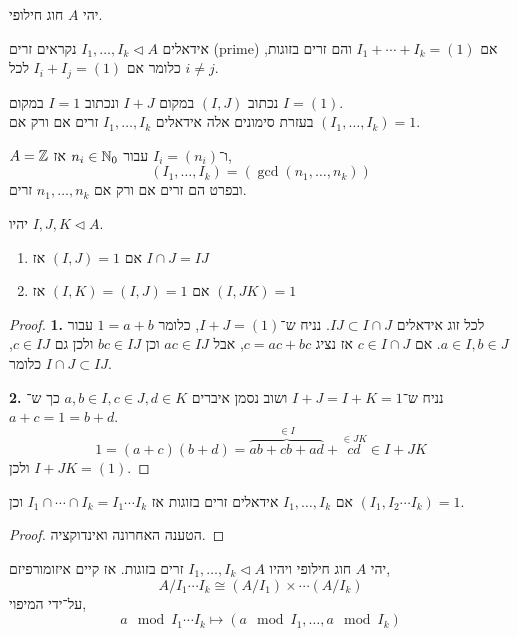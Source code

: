 יהי $A$ חוג חילופי.
\begin{definition}
	אידאלים $I_1, \ldots, I_k \triangleleft A$ נקראים זרים (prime) אם $I_1 + \cdots + I_k = (1)$ והם זרים בזוגות, כלומר אם $I_i + I_j = (1)$ לכל $i \ne j$.
\end{definition}
\begin{notation}
	נכתוב $(I, J)$ במקום $I + J$ ונכתוב $I = 1$ במקום $I = (1)$. \\
	בעזרת סימונים אלה אידאלים $I_1, \ldots, I_k$ זרים אם ורק אם $(I_1, \ldots, I_k) = 1$.
\end{notation}
\begin{example}
	$A = \mathbb{Z}$ ו־$I_i = (n_i)$ עבור $n_i \in \mathbb{N}_0$ אז,
	\[
		(I_1, \ldots, I_k)
		= (\gcd(n_1, \ldots, n_k))
	\]
	ובפרט הם זרים אם ורק אם $n_1, \ldots, n_k$ זרים.
\end{example}
\begin{proposition}
	יהיו $I, J, K \triangleleft A$.
	\begin{enumerate}
		\item אם $(I, J) = 1$ אז $I \cap J = I J$
		\item אם $(I, K) = (I, J) = 1$ אז $(I, J K) = 1$
	\end{enumerate}
\end{proposition}
\begin{proof}
	\textbf{1.}
	לכל זוג אידאלים $I J \subset I \cap J$. נניח ש־$I + J = (1)$, כלומר $1 = a + b$ עבור $a \in I, b \in J$.
	אם $c \in I \cap J$ אז נציג $c = a c + b c$, אבל $a c \in I J$ וכן $b c \in I J$ ולכן גם $c \in I J$, כלומר $I \cap J \subset I J$.

	\textbf{2.}
	נניח ש־$I + J = I + K = 1$ ושוב נסמן איברים $a, b \in I, c \in J, d \in K$ כך ש־$a + c = 1 = b + d$.
	\[
		1
		= (a + c)(b + d)
		= \overbrace{a b + c b + a d}^{\in I} + \overset{\in J K}{c d}
		\in I + J K
	\]
	ולכן $I + J K = (1)$.
\end{proof}
\begin{corollary}
	אם $I_1, \ldots, I_k$ אידאלים זרים בזוגות אז $I_1 \cap \cdots \cap I_k = I_1 \cdots I_k$ וכן $(I_1, I_2 \cdots I_k) = 1$.
\end{corollary}
\begin{proof}
	הטענה האחרונה ואינדוקציה.
\end{proof}
\begin{theorem}
	יהי $A$ חוג חילופי ויהיו $I_1, \ldots, I_k \triangleleft A$ זרים בזוגות.
	אז קיים איזומורפיזם,
	\[
		A / I_1 \cdots I_k
		\cong (A / I_1) \times \cdots (A / I_k)
	\]
	על־ידי המיפוי,
	\[
		a \mod I_1 \cdots I_k
		\mapsto (a \mod I_1, \ldots, a \mod I_k)
	\]
\end{theorem}
